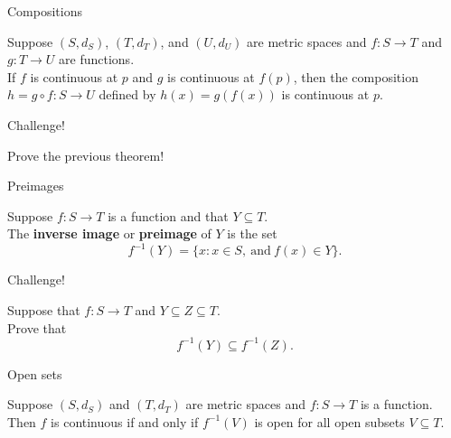 \documentclass{beamer}
\begin{document}
\begin{frame}{Compositions}
\begin{thm}
Suppose $(S,d_S)$, $(T,d_T)$, and $(U,d_U)$ are metric spaces and $f: S\rightarrow T$ and $g: T\rightarrow U$ are functions.\\
\pause
If $f$ is continuous at $p$ and $g$ is continuous at $f(p)$, then the composition $h = g\circ f: S\rightarrow U$ defined by $h(x) = g(f(x))$ is continuous at $p$.
\end{thm}
\end{frame}

\begin{frame}{Challenge!}
\begin{prob}
Prove the previous theorem!
\end{prob}
\end{frame}

\begin{frame}{Preimages}
\begin{defn}
Suppose $f: S\rightarrow T$ is a function and that $Y\subseteq T$.\\
\pause
The \textbf{inverse image} or \textbf{preimage} of $Y$ is the set
$$f^{-1}(Y) = \{x: x\in S,\ \text{and}\ f(x)\in Y\}.$$
\end{defn}
\end{frame}

\begin{frame}{Challenge!}
\begin{prob}
Suppose that $f: S\rightarrow T$ and $Y\subseteq Z\subseteq T$.\\
Prove that
$$f^{-1}(Y)\subseteq f^{-1}(Z).$$
\end{prob}
\end{frame}


\begin{frame}{Open sets}
\begin{thm}
Suppose $(S,d_S)$ and $(T,d_T)$ are metric spaces and $f: S\rightarrow T$ is a function.\\
\pause
Then $f$ is continuous if and only if $f^{-1}(V)$ is open for all open subsets $V\subseteq T$.
\end{thm}
\end{frame}
\end{document}

